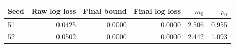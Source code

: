 \begin{tabular}{lrrrrr}
\toprule
Seed & Raw log loss & Final bound & Final log loss & $m_0$ & $p_0$ \\
\midrule
51 & 0.0425 & 0.0000 & 0.0000 & 2.506 & 0.955 \\
52 & 0.0502 & 0.0000 & 0.0000 & 2.442 & 1.093 \\
\bottomrule
\end{tabular}
